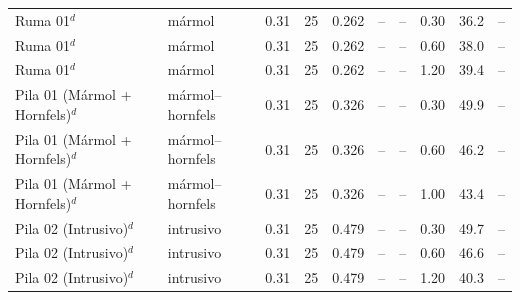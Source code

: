 \documentclass[11pt,letterpaper]{article}
\begin{document}
\begin{footnotesize}
\begin{longtable}{lllrrrrrrr}
Ruma 01$^{d}$ & mármol & 0.31 & 25 & 0.262 & -- & -- & 0.30 & 36.2 & -- \\
Ruma 01$^{d}$ & mármol & 0.31 & 25 & 0.262 & -- & -- & 0.60 & 38.0 & -- \\
Ruma 01$^{d}$ & mármol & 0.31 & 25 & 0.262 & -- & -- & 1.20 & 39.4 & -- \\
Pila 01 (Mármol + Hornfels)$^{d}$ & mármol--hornfels & 0.31 & 25 & 0.326 & -- & -- & 0.30 & 49.9 & -- \\
Pila 01 (Mármol + Hornfels)$^{d}$ & mármol--hornfels & 0.31 & 25 & 0.326 & -- & -- & 0.60 & 46.2 & -- \\
Pila 01 (Mármol + Hornfels)$^{d}$ & mármol--hornfels & 0.31 & 25 & 0.326 & -- & -- & 1.00 & 43.4 & -- \\
Pila 02 (Intrusivo)$^{d}$ & intrusivo & 0.31 & 25 & 0.479 & -- & -- & 0.30 & 49.7 & -- \\
Pila 02 (Intrusivo)$^{d}$ & intrusivo & 0.31 & 25 & 0.479 & -- & -- & 0.60 & 46.6 & -- \\
Pila 02 (Intrusivo)$^{d}$ & intrusivo & 0.31 & 25 & 0.479 & -- & -- & 1.20 & 40.3 & -- \\
\bottomrule
\end{longtable}\end{footnotesize}
\end{document}
